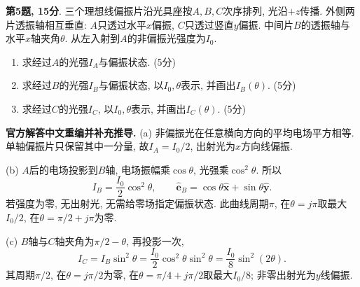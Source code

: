 \begin{exercise}
\textbf{第5题, 15分}. \label{exam:f2.5}
三个理想线偏振片沿光具座按$A,B,C$次序排列, 光沿$+z$传播. 外侧两片透振轴相互垂直: $A$只透过水平$x$偏振, $C$只透过竖直$y$偏振. 中间片$B$的透振轴与水平$x$轴夹角$\theta$. 从左入射到$A$的非偏振光强度为$I_0$.
\begin{enumerate}[label=(\alph*)]
\item 求经过$A$的光强$I_A$与偏振状态. (5分)
\item 求经过$B$的光强$I_B$与偏振状态, 以$I_0,\theta$表示, 并画出$I_B(\theta)$. (5分)
\item 求经过$C$的光强$I_C$, 以$I_0,\theta$表示, 并画出$I_C(\theta)$. (5分)
\end{enumerate}
\end{exercise}
\begin{solution}
\textbf{官方解答中文重编并补充推导.}
(a) 非偏振光在任意横向方向的平均电场平方相等. 单轴偏振片只保留其中一分量, 故$I_A=I_0/2$, 出射光为$x$方向线偏振.

(b) $A$后的电场投影到$B$轴, 电场振幅乘$\cos\theta$, 光强乘$\cos^2\theta$. 所以
\[
I_B=\frac{I_0}{2}\cos^2\theta,
\qquad \hat{\boldsymbol e}_B=\cos\theta\hat{\boldsymbol x}+\sin\theta\hat{\boldsymbol y}.
\]
若强度为零, 无出射光, 无需给零场指定偏振状态. 此曲线周期$\pi$, 在$\theta=j\pi$取最大$I_0/2$, 在$\theta=\pi/2+j\pi$为零.

(c) $B$轴与$C$轴夹角为$\pi/2-\theta$, 再投影一次,
\[
I_C=I_B\sin^2\theta=\frac{I_0}{2}\cos^2\theta\sin^2\theta
=\frac{I_0}{8}\sin^2(2\theta).
\]
其周期$\pi/2$, 在$\theta=j\pi/2$为零, 在$\theta=\pi/4+j\pi/2$取最大$I_0/8$; 非零出射光为$y$线偏振.
\begin{center}
\end{center}
\end{solution}

